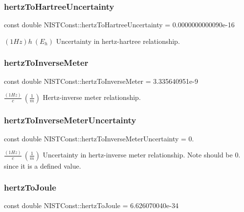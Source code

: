 \subsubsection{\texorpdfstring{hertz\+To\+Hartree\+Uncertainty}{hertzToHartreeUncertainty}}
{\footnotesize\ttfamily const double N\+I\+S\+T\+Const\+::hertz\+To\+Hartree\+Uncertainty = 0.\+0000000000090e-\/16}

$(1 Hz)h \ (E_h)$ Uncertainty in hertz-\/hartree relationship. \mbox{\label{group___n_i_s_t_const-_hertz_ga6d5ccd7fed8ad7f2abb5c368565a1666}} 
\subsubsection{\texorpdfstring{hertz\+To\+Inverse\+Meter}{hertzToInverseMeter}}
{\footnotesize\ttfamily const double N\+I\+S\+T\+Const\+::hertz\+To\+Inverse\+Meter = 3.\+335640951e-\/9}

$\frac{(1 Hz)}{c} \ (\frac{1}{m})$ Hertz-\/inverse meter relationship. \mbox{\label{group___n_i_s_t_const-_hertz_ga4a12fd74059017b7f715ed732182c47b}} 
\subsubsection{\texorpdfstring{hertz\+To\+Inverse\+Meter\+Uncertainty}{hertzToInverseMeterUncertainty}}
{\footnotesize\ttfamily const double N\+I\+S\+T\+Const\+::hertz\+To\+Inverse\+Meter\+Uncertainty = 0.}

$\frac{(1 Hz)}{c} \ (\frac{1}{m})$ Uncertainty in hertz-\/inverse meter relationship. Note should be 0. since it is a defined value. \mbox{\label{group___n_i_s_t_const-_hertz_ga827c4e99287fcd5363fabcfe1381cc37}} 
\subsubsection{\texorpdfstring{hertz\+To\+Joule}{hertzToJoule}}
{\footnotesize\ttfamily const double N\+I\+S\+T\+Const\+::hertz\+To\+Joule = 6.\+626070040e-\/34}

